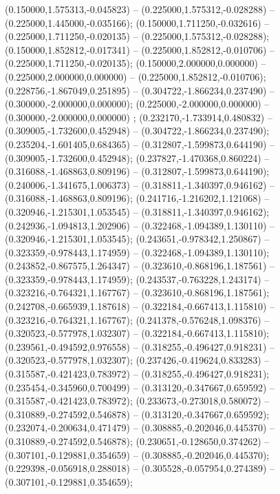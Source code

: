  (0.150000,1.575313,-0.045823) -- (0.225000,1.575312,-0.028288) -- (0.225000,1.445000,-0.035166);
 (0.150000,1.711250,-0.032616) -- (0.225000,1.711250,-0.020135) -- (0.225000,1.575312,-0.028288);
 (0.150000,1.852812,-0.017341) -- (0.225000,1.852812,-0.010706) -- (0.225000,1.711250,-0.020135);
 (0.150000,2.000000,0.000000) -- (0.225000,2.000000,0.000000) -- (0.225000,1.852812,-0.010706);
 (0.228756,-1.867049,0.251895) -- (0.304722,-1.866234,0.237490) -- (0.300000,-2.000000,0.000000);
 (0.225000,-2.000000,0.000000) -- (0.300000,-2.000000,0.000000) ;
 (0.232170,-1.733914,0.480832) -- (0.309005,-1.732600,0.452948) -- (0.304722,-1.866234,0.237490);
 (0.235204,-1.601405,0.684365) -- (0.312807,-1.599873,0.644190) -- (0.309005,-1.732600,0.452948);
 (0.237827,-1.470368,0.860224) -- (0.316088,-1.468863,0.809196) -- (0.312807,-1.599873,0.644190);
 (0.240006,-1.341675,1.006373) -- (0.318811,-1.340397,0.946162) -- (0.316088,-1.468863,0.809196);
 (0.241716,-1.216202,1.121068) -- (0.320946,-1.215301,1.053545) -- (0.318811,-1.340397,0.946162);
 (0.242936,-1.094813,1.202906) -- (0.322468,-1.094389,1.130110) -- (0.320946,-1.215301,1.053545);
 (0.243651,-0.978342,1.250867) -- (0.323359,-0.978443,1.174959) -- (0.322468,-1.094389,1.130110);
 (0.243852,-0.867575,1.264347) -- (0.323610,-0.868196,1.187561) -- (0.323359,-0.978443,1.174959);
 (0.243537,-0.763228,1.243174) -- (0.323216,-0.764321,1.167767) -- (0.323610,-0.868196,1.187561);
 (0.242708,-0.665939,1.187618) -- (0.322184,-0.667413,1.115810) -- (0.323216,-0.764321,1.167767);
 (0.241378,-0.576248,1.098376) -- (0.320523,-0.577978,1.032307) -- (0.322184,-0.667413,1.115810);
 (0.239561,-0.494592,0.976558) -- (0.318255,-0.496427,0.918231) -- (0.320523,-0.577978,1.032307);
 (0.237426,-0.419624,0.833283) -- (0.315587,-0.421423,0.783972) -- (0.318255,-0.496427,0.918231);
 (0.235454,-0.345960,0.700499) -- (0.313120,-0.347667,0.659592) -- (0.315587,-0.421423,0.783972);
 (0.233673,-0.273018,0.580072) -- (0.310889,-0.274592,0.546878) -- (0.313120,-0.347667,0.659592);
 (0.232074,-0.200634,0.471479) -- (0.308885,-0.202046,0.445370) -- (0.310889,-0.274592,0.546878);
 (0.230651,-0.128650,0.374262) -- (0.307101,-0.129881,0.354659) -- (0.308885,-0.202046,0.445370);
 (0.229398,-0.056918,0.288018) -- (0.305528,-0.057954,0.274389) -- (0.307101,-0.129881,0.354659);
